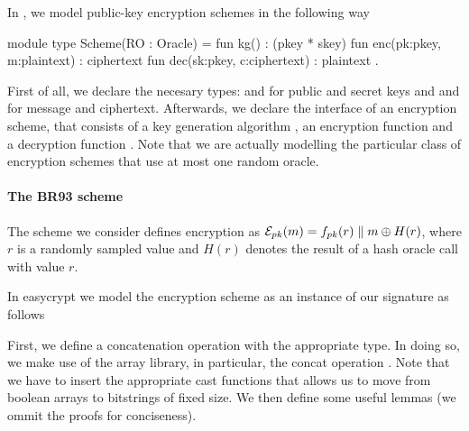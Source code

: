 In \EC, we model public-key encryption schemes in the following way
\begin{easycrypt}[label={lst:enc_scheme}]{}
 module type Scheme(RO : Oracle) = {
  fun kg() : (pkey * skey)
  fun enc(pk:pkey, m:plaintext) : ciphertext
  fun dec(sk:pkey, c:ciphertext) : plaintext
 }.
\end{easycrypt}
First of all, we declare the necesary types:  and 
for public and secret keys and  and  for
message and ciphertext. Afterwards, we declare the interface of an
encryption scheme, that consists of a key generation algorithm
, an encryption function  and a decryption function
. Note that we are actually modelling the particular class of
encryption schemes that use at most one random oracle.

\paragraph{The BR93 scheme}
The scheme we consider defines encryption as 
$\mathcal{E}_{pk}(m) = f_{pk}(r) \parallel m \oplus H(r)$, where $r$ is a
randomly sampled value and $H(r)$ denotes the result of a hash oracle
call with value $r$.

 In easycrypt we model the encryption scheme as an instance of our
  signature as follows

First, we define a concatenation operation with the appropriate
type. In doing so, we make use of the array library, in particular,
the concat operation \ec{||}. Note that we have to insert the
appropriate cast functions that allows us to move from boolean arrays
to bitstrings of fixed size. We then define some useful lemmas (we
ommit the proofs for conciseness).

